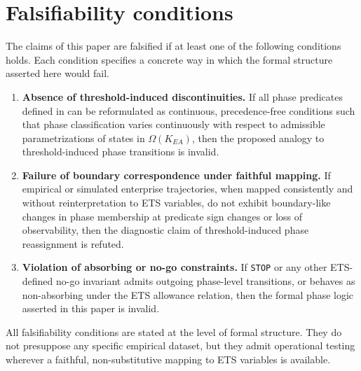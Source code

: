 ﻿\section{Falsifiability conditions}
\label{sec:falsify}

The claims of this paper are falsified if at least one of the following
conditions holds.
Each condition specifies a concrete way in which the formal structure
asserted here would fail.

\begin{enumerate}
  \item \textbf{Absence of threshold-induced discontinuities.}
  If all phase predicates defined in  can be
  reformulated as continuous, precedence-free conditions such that
  phase classification varies continuously with respect to admissible
  parametrizations of states in $\Omega(K_{EA})$, then the proposed
  analogy to threshold-induced phase transitions is invalid.

  \item \textbf{Failure of boundary correspondence under faithful mapping.}
  If empirical or simulated enterprise trajectories, when mapped
  consistently and without reinterpretation to ETS variables, do not
  exhibit boundary-like changes in phase membership at predicate sign
  changes or loss of observability, then the diagnostic claim of
  threshold-induced phase reassignment is refuted.

  \item \textbf{Violation of absorbing or no-go constraints.}
  If \texttt{STOP} or any other ETS-defined no-go invariant admits
  outgoing phase-level transitions, or behaves as non-absorbing under
  the ETS allowance relation, then the formal phase logic asserted in
  this paper is invalid.
\end{enumerate}

All falsifiability conditions are stated at the level of formal structure.
They do not presuppose any specific empirical dataset, but they admit
operational testing wherever a faithful, non-substitutive mapping to
ETS variables is available.
